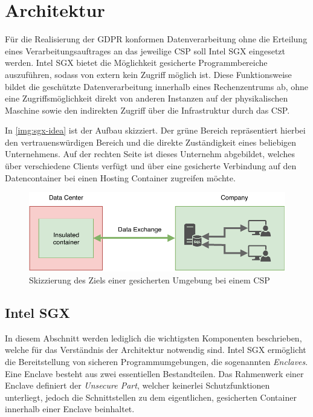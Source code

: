 \section{Architektur}
Für die Realisierung der GDPR konformen Datenverarbeitung ohne die Erteilung eines Verarbeitungsauftrages an das jeweilige \ac{CSP} soll Intel SGX eingesetzt werden. Intel SGX bietet die Möglichkeit gesicherte Programmbereiche auszuführen, sodass von extern kein Zugriff möglich ist. Diese Funktionsweise bildet die geschützte Datenverarbeitung innerhalb eines Rechenzentrums ab, ohne eine Zugriffsmöglichkeit direkt von anderen Instanzen auf der physikalischen Maschine sowie den indirekten Zugriff über die Infrastruktur durch das \ac{CSP}. 

In \autoref{img:sgx-idea} ist der Aufbau skizziert. Der grüne Bereich repräsentiert hierbei den vertrauenswürdigen Bereich und die direkte Zuständigkeit eines beliebigen Unternehmens. Auf der rechten Seite ist dieses Unternehm abgebildet, welches über verschiedene Clients verfügt und über eine gesicherte Verbindung auf den Datencontainer bei einen Hosting Container zugreifen möchte. 

\begin{figure}[h!]
	\centering
	\includegraphics{img/sgx_idea/sgx-idea.pdf}
	\caption{Skizzierung des Ziels einer gesicherten Umgebung bei einem \ac{CSP}}
	\label{img:sgx-idea}
\end{figure}

\subsection{Intel SGX}
 In diesem Abschnitt werden lediglich die wichtigsten Komponenten beschrieben, welche für das Verständnis der Architektur notwendig sind. Intel SGX ermöglicht die Bereitstellung von sicheren Programmumgebungen, die sogenannten \emph{Enclaves}. Eine Enclave besteht aus zwei essentiellen Bestandteilen. Das Rahmenwerk einer Enclave definiert der \emph{Unsecure Part},  welcher keinerlei Schutzfunktionen unterliegt, jedoch die Schnittstellen zu dem eigentlichen, gesicherten Container innerhalb einer Enclave beinhaltet.
 
